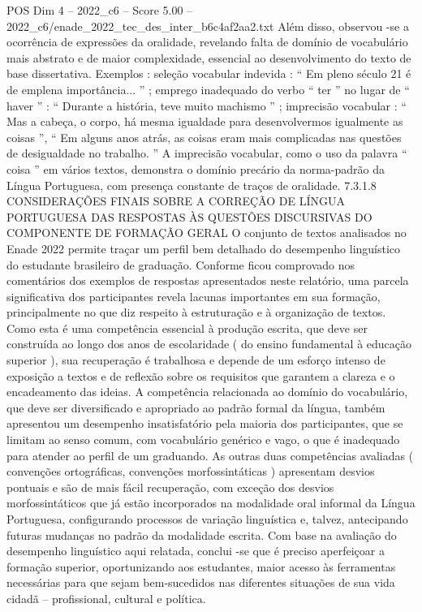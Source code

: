 \begin{textsample}{POS Dim 4 – 2022\_c6 – Score 5.00 – 2022\_c6/enade\_2022\_tec\_des\_inter\_b6c4af2aa2.txt}
Além disso, observou -se a ocorrência de expressões da oralidade, revelando falta de domínio de vocabulário mais abstrato e de maior complexidade, essencial ao desenvolvimento do texto de base dissertativa.
Exemplos : seleção vocabular indevida : “ Em pleno século 21 é de emplena importância... ” ; emprego inadequado do verbo “ ter ” no lugar de “ haver ” : “ Durante a história, teve muito machismo ” ; imprecisão vocabular : “ Mas a cabeça, o corpo, há mesma igualdade para desenvolvermos igualmente as coisas ”, “ Em alguns anos atrás, as coisas eram mais complicadas nas questões de desigualdade no trabalho. ” A imprecisão vocabular, como o uso da palavra “ coisa ” em vários textos, demonstra o domínio precário da norma-padrão da Língua Portuguesa, com presença constante de traços de oralidade. 7.3.1.8 CONSIDERAÇÕES FINAIS SOBRE A CORREÇÃO DE LÍNGUA PORTUGUESA DAS RESPOSTAS ÀS QUESTÕES DISCURSIVAS DO COMPONENTE DE FORMAÇÃO GERAL O conjunto de textos analisados no Enade 2022 permite traçar um perfil bem detalhado do desempenho linguístico do estudante brasileiro de graduação.
Conforme ficou comprovado nos comentários dos exemplos de respostas apresentados neste relatório, uma parcela significativa dos participantes revela lacunas importantes em sua formação, principalmente no que diz respeito à estruturação e à organização de textos.
Como esta é uma competência essencial à produção escrita, que deve ser construída ao longo dos anos de escolaridade ( do ensino fundamental à educação superior ), sua recuperação é trabalhosa e depende de um esforço intenso de exposição a textos e de reflexão sobre os requisitos que garantem a clareza e o encadeamento das ideias.
A competência relacionada ao domínio do vocabulário, que deve ser diversificado e apropriado ao padrão formal da língua, também apresentou um desempenho insatisfatório pela maioria dos participantes, que se limitam ao senso comum, com vocabulário genérico e vago, o que é inadequado para atender ao perfil de um graduando.
As outras duas competências avaliadas ( convenções ortográficas, convenções morfossintáticas ) apresentam desvios pontuais e são de mais fácil recuperação, com exceção dos desvios morfossintáticos que já estão incorporados na modalidade oral informal da Língua Portuguesa, configurando processos de variação linguística e, talvez, antecipando futuras mudanças no padrão da modalidade escrita.
Com base na avaliação do desempenho linguístico aqui relatada, conclui -se que é preciso aperfeiçoar a formação superior, oportunizando aos estudantes, maior acesso às ferramentas necessárias para que sejam bem-sucedidos nas diferentes situações de sua vida cidadã – profissional, cultural e política.

\end{textsample}
